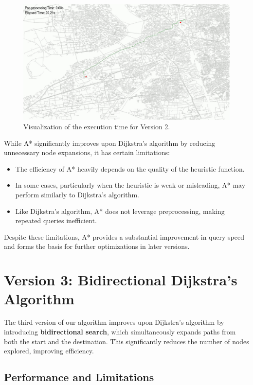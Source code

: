 	\begin{figure}[h]
		\centering
		\includegraphics[width=1.0\textwidth]{astar.png}
		\caption{Visualization of the execution time for Version 2.}
		\label{fig:astar_timing}
	\end{figure}
	
	While A* significantly improves upon Dijkstra’s algorithm by reducing unnecessary node expansions, it has certain limitations:
	\begin{itemize}
		\item The efficiency of A* heavily depends on the quality of the heuristic function.
		\item In some cases, particularly when the heuristic is weak or misleading, A* may perform similarly to Dijkstra’s algorithm.
		\item Like Dijkstra's algorithm, A* does not leverage preprocessing, making repeated queries inefficient.
	\end{itemize}
	
	Despite these limitations, A* provides a substantial improvement in query speed and forms the basis for further optimizations in later versions.
	
	\section{Version 3: Bidirectional Dijkstra's Algorithm}
	
	The third version of our algorithm improves upon Dijkstra’s algorithm by introducing \textbf{bidirectional search}, which simultaneously expands paths from both the start and the destination. This significantly reduces the number of nodes explored, improving efficiency.
	
	\subsection{Performance and Limitations}
	
